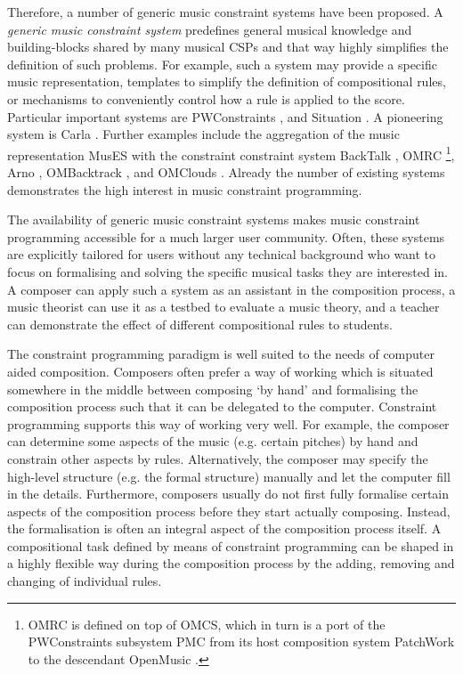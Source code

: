\documentclass{scrartcl}
\begin{document}
Therefore, a number of generic music constraint systems have been proposed. A \emph{generic music constraint system} predefines general musical knowledge and building-blocks shared by many musical CSPs and that way highly simplifies the definition of such problems. For example, such a system may provide a specific music representation, templates to simplify the definition of compositional rules, or mechanisms to conveniently control how a rule is applied to the score. Particular important systems are PWConstraints \citep{Laurson:PhD:1996}, and Situation \citep{Rueda:1998,Bonnet:Rueda:Situation:1999}. A pioneering system is Carla \citep{Courtot:ICMC90}. Further examples include the aggregation of the music representation MusES with the constraint constraint system BackTalk \citep{Pachet:Roy:ConstraintsAndObjects:95}, OMRC \citep{Sandred:OMRC:2000,Sandred:PRISMA01:2003}\footnote{OMRC is defined on top of OMCS, which in turn is a port of the PWConstraints subsystem PMC from its host composition system PatchWork \citep{Laurson:PhD:1996} to the descendant OpenMusic \citep{Assayag:1999}.}, Arno \citep{Anders:ICMC:2000}, OMBacktrack \citep{Truchet:OMBTTutorial}, and OMClouds \citep{Truchet:Chypre2001,Truchet:etAl:2003}.
Already the number of existing systems demonstrates the high interest in music constraint programming. 

The availability of generic music constraint systems makes music constraint programming accessible for a much larger user community. 
Often, these systems are explicitly tailored for users without any technical background who want to focus on formalising and solving the specific musical tasks they are interested in. 
A composer can apply such a system as an assistant in the composition process, a music theorist can use it as a testbed to evaluate a music theory, and a teacher can demonstrate the effect of different compositional rules to students.

The constraint programming paradigm is well suited to the needs of computer aided composition.
Composers often prefer a way of working which is situated somewhere in the middle between composing `by hand' and formalising the composition process such that it can be delegated to the computer. Constraint programming supports this way of working very well. For example, the composer can determine some aspects of the music (e.g. certain pitches) by hand and constrain other aspects by rules. Alternatively, the composer may specify the high-level structure (e.g. the formal structure) manually and let the computer fill in the details.
Furthermore, composers usually do not first fully formalise certain aspects of the composition process before they start actually composing. Instead, the formalisation is often an integral aspect of the composition process itself. A compositional task defined by means of constraint programming can be shaped in a highly flexible way during the composition process by the adding, removing and changing of individual rules. 
\end{document}

